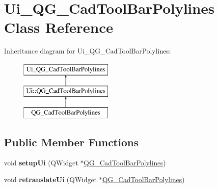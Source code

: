 \hypertarget{classUi__QG__CadToolBarPolylines}{\section{Ui\-\_\-\-Q\-G\-\_\-\-Cad\-Tool\-Bar\-Polylines Class Reference}
\label{classUi__QG__CadToolBarPolylines}
}
Inheritance diagram for Ui\-\_\-\-Q\-G\-\_\-\-Cad\-Tool\-Bar\-Polylines\-:\begin{figure}[H]
\begin{center}
\leavevmode
\includegraphics[height=3.000000cm]{classUi__QG__CadToolBarPolylines}
\end{center}
\end{figure}
\subsection*{Public Member Functions}
\begin{DoxyCompactItemize}
\item 
\hypertarget{classUi__QG__CadToolBarPolylines_a6a6e8e1c633fd3011913278a3792edc6}{void {\bfseries setup\-Ui} (Q\-Widget $\ast$\hyperlink{classQG__CadToolBarPolylines}{Q\-G\-\_\-\-Cad\-Tool\-Bar\-Polylines})}\label{classUi__QG__CadToolBarPolylines_a6a6e8e1c633fd3011913278a3792edc6}

\item 
\hypertarget{classUi__QG__CadToolBarPolylines_aa516ddc615d2a6d2259d04707f4fb2d3}{void {\bfseries retranslate\-Ui} (Q\-Widget $\ast$\hyperlink{classQG__CadToolBarPolylines}{Q\-G\-\_\-\-Cad\-Tool\-Bar\-Polylines})}\label{classUi__QG__CadToolBarPolylines_aa516ddc615d2a6d2259d04707f4fb2d3}

\end{DoxyCompactItemize}

